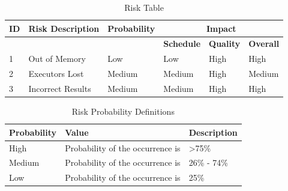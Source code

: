\documentclass[oneside,a4paper,12pt]{pictreport}
\begin{document}
\renewcommand{\arraystretch}{1.5}
\begin{table}[h!]
\caption{Risk Table}
\begin{tabular}{|l|l|l|l|l|l|}
\hline
\textbf{ID} & \textbf{Risk Description} & \textbf{Probability} & \multicolumn{3}{c|}{\textbf{Impact}}                                         \\ \hline
            & \textbf{}                 & \textbf{}            & \textbf{Schedule} & \textbf{Quality} & \textbf{Overall} \\ \hline
1           & Out of Memory             & Low                  & Low                      & High                    & High                    \\ \hline
2           & Executors Lost            & Medium               & Medium                   & High                    & Medium                  \\ \hline
3           & Incorrect Results         & Medium               & Medium                   & High                    & High                    \\ \hline
\end{tabular}
\end{table}

\begin{table}[h!]
\centering
\caption{Risk Probability Definitions}
\begin{tabular}{|l|l|l|}
\hline
\textbf{Probability} & \textbf{Value}                   & \textbf{Description} \\ \hline
High                 & Probability of the occurrence is & \textgreater 75\%    \\ \hline
Medium               & Probability of the occurrence is & 26\% - 74\%          \\ \hline
Low                  & Probability of the occurrence is & 25\%                 \\ \hline
\end{tabular}
\end{table}
\end{document}
